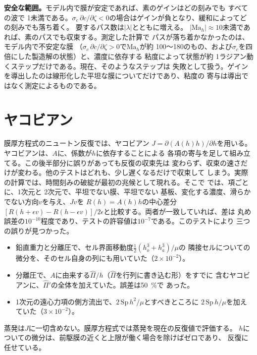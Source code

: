 \textbf{安全な範囲。}モデル内で膜が安定であれば、素のゲインはどの刻みでも
すべての波で 1未満である。$\sigma_c\,\partial
c/\partial\zeta < 0$の場合はゲインが負となり、緩和によってどの刻みでも落ち着く。
要するパス数は$|\lambda|$とともに増える。
$|\mathrm{Ma}_h| \approx 10$未満であれば、素のパスでも収束する。測定した計算で
パスが落ち着かなかったのは、モデル内で不安定な膜
（$\sigma_c\,\partial c/\partial\zeta > 0$で$\mathrm{Ma}_h$が約
100～180のもの、および$\sigma_c$を四倍にした製造解の状態）と、濃度に依存する
粘度によって状態が約 1ラジアン動くステップだけである。現在、そのようなステップは
失敗として扱う。ゲインを導出したのは線形化した平坦な膜についてだけであり、粘度の
寄与は導出ではなく測定によるものである。

\section{ヤコビアン}
\label{sec:verification:jacobian}

膜厚方程式のニュートン反復では、ヤコビアン
$J = \partial(A(h)h)/\partial h$を用いる。ヤコビアンは、$A$に、係数が$h$に依存することによる
各項の寄与を足して組み立てる。この後半部分に誤りがあっても反復の収束先は
変わらず、収束の速さだけが変わる。他のテストはどれも、少し遅くなるだけで収束して
しまう。実際の計算では、時間刻みの破綻が最初の兆候として現れる。そこで
では、項ごとに、1次元と 2次元で、平坦でない膜、平坦でない
基板、変化する濃度、滑らかでない方向$v$を与え、$J v$を
$R(h) = A(h)h$の中心差分$[R(h+\epsilon v) -
R(h-\epsilon v)]/2\epsilon$と比較する。両者が一致していれば、差は
丸め誤差の$10^{-10}$程度であり、テストの許容値は$10^{-7}$である。このテストにより
三つの誤りが見つかった。

\begin{itemize}
  \item 鉛直重力と分離圧で、セル界面移動度$\tfrac12(h_o^3 + h_a^3)/\mu$の
    隣接セルについての微分を、そのセル自身の列にも用いていた（$2\times10^{-2}$）。
  \item 分離圧で、$A$に由来する$\hat\Pi/h$（$\hat\Pi$を行列に書き込む形）をすでに
    含むヤコビアンに、$\hat\Pi'$の全体を加えていた。誤差は\SI{50}{\percent}で
    あった。
  \item 1次元の遠心力項の側方流出で、$2\,\mathrm{Sp}\,h^2/\mu$とすべきところに
    $2\,\mathrm{Sp}\,h/\mu$を加えていた（$3\times10^{-2}$）。
\end{itemize}

蒸発は$J$に一切含めない。膜厚方程式では蒸発を現在の反復値で評価する。
$h$についての微分は、前駆膜の近くと上限が働く場合を除けばゼロであり、
反復に任せている。

